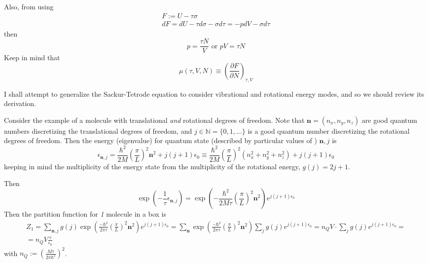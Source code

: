 \documentclass[10pt]{amsart}
\begin{document}
\begin{multicols*}{2}
Also, from using 
\[
\begin{gathered}
  F := U -\tau \sigma \\ 
  dF = dU -\tau d\sigma - \sigma d\tau = - p dV - \sigma d\tau 
\end{gathered}
\]
then
\[
p=\frac{\tau N}{V} \text{ or } pV = \tau N
\]
Keep in mind that 
\[
\mu(\tau, V,N) \equiv \left( \frac{ \partial F}{\partial N} \right)_{\tau,V}
\]

I shall attempt to generalize the Sackur-Tetrode equation to consider vibrational and rotational energy modes, and so we should review its derivation.  

Consider the example of a molecule with translational \emph{and } rotational degrees of freedom.  Note that $\mathbf{n} = (n_x,n_y,n_z)$ are good quantum numbers discretizing the translational degrees of freedom, and $j \in \mathbb{N} = \lbrace 0 ,1 , \dots \rbrace$ is a good quantum number discretizing the rotational degrees of freedom.  Then the energy (eigenvalue) for quantum state (described by particular values of ) $\mathbf{n},j$ is
\[
\epsilon_{\mathbf{n},j} = \frac{ \hbar^2}{2M} \left( \frac{\pi}{L} \right)^2 \mathbf{n}^2 + j(j+1) \epsilon_0 \equiv \frac{\hbar^2}{2M} \left( \frac{\pi}{L} \right)^2 (n_x^2 + n_y^2 + n_z^2 ) + j(j+1) \epsilon_0
\]
keeping in mind the multiplicity of the energy state from the multiplicity of the rotational energy, $g(j) = 2j+1$.  

Then
\[
\exp{\left( -\frac{1}{\tau} \epsilon_{\mathbf{n},j} \right) } = \exp{ \left( -\frac{\hbar^2}{2M\tau} \left( \frac{\pi}{L} \right)^2 \mathbf{n}^2 \right) } e^{j(j+1) \epsilon_0 }
\]
Then the partition function for \emph{1} molecule in a box is 
\[
\begin{gathered}
  Z_1 = \sum_{\mathbf{n},j} g(j) \exp{ \left( \frac{-\hbar^2}{2\pi \tau} \left( \frac{\pi}{L} \right)^2 \mathbf{n}^2 \right) } e^{j(j+1) \epsilon_0 } = \sum_{\mathbf{n}} \exp{ \left( \frac{ -\hbar^2}{2\pi \tau} \left( \frac{\pi}{L} \right)^2 \mathbf{n}^2 \right) } \sum_j g(j) e^{j(j+1)\epsilon_0 } = n_Q V \cdot \sum_j g(j) e^{j(j+1)\epsilon_0} = \\
  =  n_Q V \frac{\tau}{\epsilon_0 }
\end{gathered}
\]
with $n_Q := \left( \frac{M\tau}{2\pi \hbar^2 } \right)^2$. 


\end{multicols*}
\end{document}
